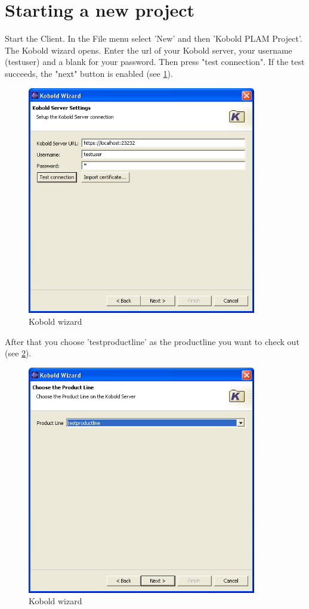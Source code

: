 \section{Starting a new project}

Start the Client.
In the File menu select 'New' and then 'Kobold PLAM Project'. The Kobold wizard opens.
Enter the url of your Kobold server, your username (testuser) and a blank for your password. Then press
"test connection". If the test succeeds, the "next" button is enabled (see \ref{project1}).

\begin{figure}[h!]
\begin{center}
\includegraphics[width=10cm]{tutorial4.png}
   \caption{Kobold wizard}
   \label{project1}
\end{center}
\end{figure}\par

After that you choose 'testproductline' as the productline you want to check out (see \ref{project2}).

\begin{figure}[h!]
\begin{center}
\includegraphics[width=10cm]{tutorial5.png}
   \caption{Kobold wizard}
   \label{project2}
\end{center}
\end{figure}\par

